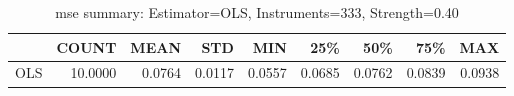 \begin{table}[ht]
\centering
\caption{mse summary: Estimator=OLS, Instruments=333, Strength=0.40}
\begin{tabular}{lrrrrrrrr}
\toprule
 & COUNT & MEAN & STD & MIN & 25\% & 50\% & 75\% & MAX \\
\midrule
OLS & 10.0000 & 0.0764 & 0.0117 & 0.0557 & 0.0685 & 0.0762 & 0.0839 & 0.0938 \\
\bottomrule
\end{tabular}
\end{table}
